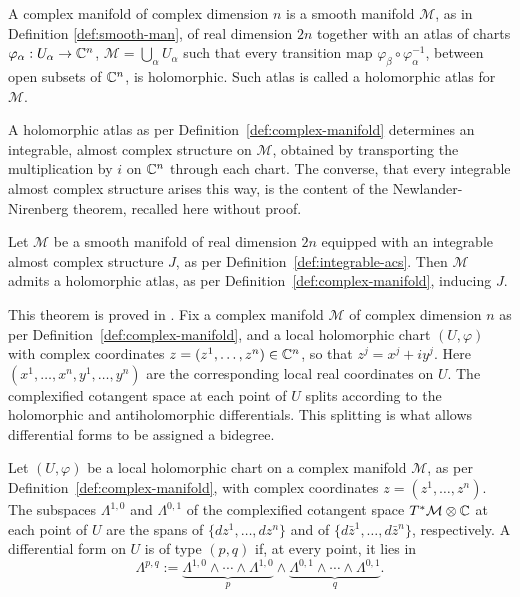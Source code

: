 \begin{definition}
	\label{def:complex-manifold}
	A complex manifold of complex dimension $n$ is a smooth manifold $\mathcal{M}$, as in Definition \ref{def:smooth-man}, of real dimension $2n$ together with an atlas of charts $\varphi_\alpha:U_\alpha\to\mathbb{C}^n$, $\mathcal{M}=\bigcup_\alpha U_\alpha$ such that every transition map $\varphi_\beta\circ\varphi_\alpha^{-1}$, between open subsets of $\mathbb{C}^n$, is holomorphic. Such atlas is called a holomorphic atlas for $\mathcal{M}$.
\end{definition}

\noindent A holomorphic atlas as per Definition~\ref{def:complex-manifold}
determines an integrable, almost complex structure on $\mathcal{M}$, obtained by transporting the multiplication by $i$ on $\mathbb{C}^n$ through each chart. The converse, that every integrable almost complex structure arises this way, is the content of the Newlander-Nirenberg theorem, recalled here without proof.

\begin{theorem}
	\label{thm:newlander-nirenberg}
	Let $\mathcal{M}$ be a smooth manifold of real dimension $2n$ equipped with an
	integrable almost complex structure $J$, as per
	Definition~\ref{def:integrable-acs}. Then $\mathcal{M}$ admits a holomorphic
	atlas, as per Definition~\ref{def:complex-manifold}, inducing $J$.
\end{theorem}

\noindent This theorem is proved in \cite[Theorem~7.4]{Moroianu2004}. Fix a complex manifold $\mathcal{M}$ of complex dimension $n$ as per Definition~\ref{def:complex-manifold}, and a local holomorphic chart $(U,\varphi)$ with complex coordinates $z=(z^1,\dots,z^n)\in\mathbb{C}^n$, so that $z^j=x^j+iy^j$. Here $(x^1,\dots,x^n,y^1,\dots,y^n)$ are the corresponding local real coordinates on $U$. The complexified cotangent space at each point of $U$ splits according to the holomorphic and antiholomorphic differentials. This splitting is what allows differential forms to be assigned a bidegree.

\begin{definition}
	\label{def:pq-forms}
	Let $(U,\varphi)$ be a local holomorphic chart on a complex manifold
	$\mathcal{M}$, as per Definition~\ref{def:complex-manifold}, with complex
	coordinates $z=(z^1,\dots,z^n)$. The subspaces $\Lambda^{1,0}$ and
	$\Lambda^{0,1}$ of the complexified cotangent space $T^*\mathcal{M}\otimes\C$
	at each point of $U$ are the spans of $\{dz^1,\dots,dz^n\}$ and of
	$\{d\bar z^1,\dots,d\bar z^n\}$, respectively. A differential
	form on $U$ is of type $(p,q)$ if, at every point, it lies in
	\begin{equation}
		\Lambda^{p,q}:=\underbrace{\Lambda^{1,0}\wedge\cdots\wedge\Lambda^{1,0}}_{p}\wedge\underbrace{\Lambda^{0,1}\wedge\cdots\wedge\Lambda^{0,1}}_{q}.
	\end{equation}
\end{definition}

